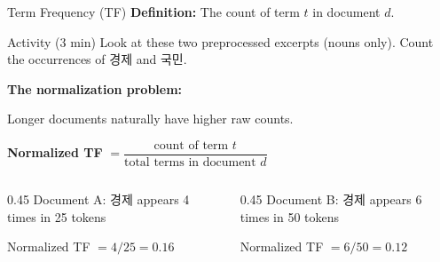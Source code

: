 \documentclass[aspectratio=169,11pt]{beamer}
\begin{document}
\begin{frame}{Term Frequency (TF)}
    \textbf{Definition:} The count of term $t$ in document $d$.

    \vspace{0.3cm}

    \begin{exampleblock}{Activity (3 min)}
        Look at these two preprocessed excerpts (nouns only). Count the occurrences of 경제 and 국민.
    \end{exampleblock}

    \vspace{0.3cm}

    \textbf{The normalization problem:}

    Longer documents naturally have higher raw counts.

    \vspace{0.2cm}

    \textbf{Normalized TF} $= \dfrac{\text{count of term } t}{\text{total terms in document } d}$

    \vspace{0.3cm}

    \begin{columns}[T]
        \begin{column}{0.45\textwidth}
            Document A: 경제 appears 4 times in 25 tokens

            Normalized TF $= 4/25 = 0.16$
        \end{column}
        \begin{column}{0.45\textwidth}
            Document B: 경제 appears 6 times in 50 tokens

            Normalized TF $= 6/50 = 0.12$
        \end{column}
    \end{columns}
\end{frame}
\end{document}
